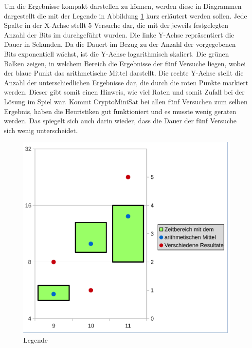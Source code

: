 Um die Ergebnisse kompakt darstellen zu können, werden diese in Diagrammen dargestellt die mit der Legende in Abbildung \ref{fig:data_lengede}
kurz erläutert werden sollen. Jede Spalte in der X-Achse stellt 5 Versuche dar, die mit der jeweils festgelegten Anzahl der Bits im 
durchgeführt wurden. Die linke Y-Achse repräsentiert die Dauer in Sekunden. Da die Dauert im Bezug zu der Anzahl der vorgegebenen Bits exponentiell
wächst, ist die Y-Achse logarithmisch skaliert. Die grünen Balken zeigen, in welchem Bereich die Ergebnisse der fünf Versuche liegen, wobei
der blaue Punkt das arithmetische Mittel darstellt. Die rechte Y-Achse stellt die Anzahl der unterschiedlichen Ergebnisse dar, die durch die
roten Punkte markiert werden. Dieser gibt somit einen Hinweis, wie viel Raten und somit Zufall bei der Lösung im Spiel war. Kommt CryptoMiniSat
bei allen fünf Versuchen zum selben Ergebnis, haben die Heuristiken gut funktioniert und es musste wenig geraten werden. Das spiegelt sich auch
darin wieder, dass die Dauer der fünf Versuche sich wenig unterscheidet.
\begin{figure}[!h]
  \centering
  \includegraphics[scale=0.55]{images/data_legend}
  \caption{Legende}
  \label{fig:data_lengede}
\end{figure}

